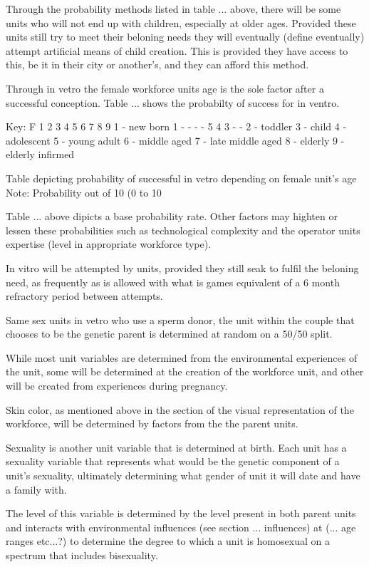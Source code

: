 Through the probability methods listed in table ... above, there will be some units who will not end up with children, especially at older ages. Provided these units still try to meet their beloning needs they will eventually (define eventually) attempt artificial means of child creation. This is provided they have access to this, be it in their city or another's, and they can afford this method.

Through in vetro the female workforce units age is the sole factor after a successful conception. Table ... shows the probabilty of success for in ventro.

			        Key:
F 1  2  3  4  5  6  7  8  9     1 - new born
1 -  -  -  -  5  4  3  -  -     2 - toddler
				3 - child
				4 - adolescent
				5 - young adult
				6 - middle aged
				7 - late middle aged
				8 - elderly 
				9 - elderly infirmed

Table depicting probability of successful in vetro depending on female unit's age
Note: Probability out of 10 (0 to 10

Table ... above dipicts a base probability rate. Other factors may highten or lessen these probabilities such as technological complexity and the operator units expertise (level in appropriate workforce type).

In vitro will be attempted by units, provided they still seak to fulfil the beloning need, as frequently as is allowed with what is games equivalent of a 6 month refractory period between attempts.

Same sex units in vetro who use a sperm donor, the unit within the couple that chooses to be the genetic parent is determined at random on a 50/50 split.


While most unit variables are determined from the environmental experiences of the unit, some will be determined at the creation of the workforce unit, and other will be created from experiences during pregnancy.

Skin color, as mentioned above in the section of the visual representation of the workforce, will be determined by factors from the the parent units.

Sexuality is another unit variable that is determined at birth. Each unit has a sexuality variable that represents what would be the genetic component of a unit's sexuality, ultimately determining what gender of unit it will date and have a family with.

The level of this variable is determined by the level present in both parent units and interacts with environmental influences (see section ... influences) at (... age ranges etc...?) to determine the degree to which a unit is homosexual on a spectrum that includes bisexuality. 

